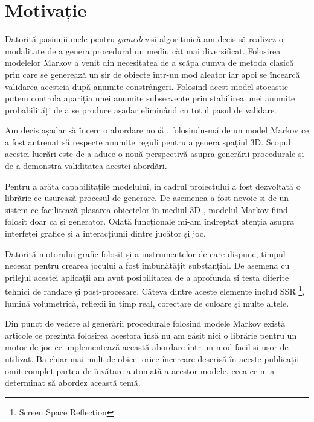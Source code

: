 \chapter*{Motivație} 

Datorită pasiunii mele pentru \textit{gamedev} și algoritmică am decis să realizez o modalitate de a genera procedural un mediu căt mai diversificat. Folosirea modelelor Markov a venit din necesitatea de a scăpa cumva de metoda clasică prin care se generează un șir de obiecte într-un mod aleator iar apoi se încearcă validarea acesteia după anumite constrângeri. Folosind acest model stocastic putem controla apariția unei anumite subsecvențe prin stabilirea unei anumite probabilități de a se produce așadar eliminând cu totul pasul de validare.\par

Am decis așadar să încerc o abordare nouă , folosindu-mă de un model Markov ce a fost antrenat să respecte anumite reguli pentru a genera spațiul 3D. Scopul acestei lucrări este de a aduce o nouă perspectivă asupra generării procedurale și de a demonstra validitatea acestei abordări.\par

Pentru a arăta capabilitățile modelului, în cadrul proiectului a fost dezvoltată o librărie ce ușurează procesul de generare. De asemenea a fost nevoie și de un sistem ce facilitează plasarea obiectelor în mediul 3D , modelul Markov fiind folosit doar ca și generator. Odată funcționale mi-am îndreptat atenția asupra interfeței grafice și a interacțiunii dintre jucător și joc.\par

Datorită motorului grafic folosit și a instrumentelor de care dispune, timpul necesar pentru crearea jocului a fost îmbunătățit substanțial. De asemena cu prilejul acestei aplicații am avut posibilitatea de a aprofunda și testa diferite tehnici de randare și post-procesare. Câteva dintre aceste elemente includ SSR \footnote{Screen Space Reflection}, lumină volumetrică, reflexii în timp real, corectare de culoare și multe altele.\par

Din punct de vedere al generării procedurale folosind modele Markov există articole ce prezintă folosirea acestora însă nu am găsit nici o librărie pentru un motor de joc ce implementează această abordare într-un mod facil și ușor de utilizat. Ba chiar mai mult de obicei orice încercare descrisă în aceste publicații omit complet partea de învățare automată a acestor modele, ceea ce m-a determinat să abordez această temă.\par

